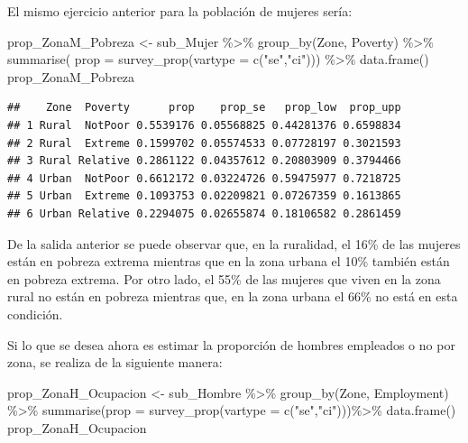 \documentclass[
  12pt,
]{book}
\newenvironment{Shaded}{\begin{snugshade}}{\end{snugshade}}
\newcommand{\AttributeTok}[1]{\textcolor[rgb]{0.77,0.63,0.00}{#1}}
\newcommand{\FunctionTok}[1]{\textcolor[rgb]{0.00,0.00,0.00}{#1}}
\newcommand{\NormalTok}[1]{#1}
\newcommand{\OtherTok}[1]{\textcolor[rgb]{0.56,0.35,0.01}{#1}}
\newcommand{\SpecialCharTok}[1]{\textcolor[rgb]{0.00,0.00,0.00}{#1}}
\newcommand{\StringTok}[1]{\textcolor[rgb]{0.31,0.60,0.02}{#1}}
\begin{document}
El mismo ejercicio anterior para la población de mujeres sería:

\begin{Shaded}
\begin{Highlighting}[]
\NormalTok{prop\_ZonaM\_Pobreza }\OtherTok{\textless{}{-}}\NormalTok{ sub\_Mujer }\SpecialCharTok{\%\textgreater{}\%} 
                      \FunctionTok{group\_by}\NormalTok{(Zone, Poverty) }\SpecialCharTok{\%\textgreater{}\%} 
                      \FunctionTok{summarise}\NormalTok{( }\AttributeTok{prop =} \FunctionTok{survey\_prop}\NormalTok{(}\AttributeTok{vartype =} \FunctionTok{c}\NormalTok{(}\StringTok{"se"}\NormalTok{,}\StringTok{"ci"}\NormalTok{))) }\SpecialCharTok{\%\textgreater{}\%}
                      \FunctionTok{data.frame}\NormalTok{()}
\NormalTok{prop\_ZonaM\_Pobreza}
\end{Highlighting}
\end{Shaded}

\begin{verbatim}
##    Zone  Poverty      prop    prop_se   prop_low  prop_upp
## 1 Rural  NotPoor 0.5539176 0.05568825 0.44281376 0.6598834
## 2 Rural  Extreme 0.1599702 0.05574533 0.07728197 0.3021593
## 3 Rural Relative 0.2861122 0.04357612 0.20803909 0.3794466
## 4 Urban  NotPoor 0.6612172 0.03224726 0.59475977 0.7218725
## 5 Urban  Extreme 0.1093753 0.02209821 0.07267359 0.1613865
## 6 Urban Relative 0.2294075 0.02655874 0.18106582 0.2861459
\end{verbatim}

De la salida anterior se puede observar que, en la ruralidad, el 16\% de las mujeres están en pobreza extrema mientras que en la zona urbana el 10\% también están en pobreza extrema. Por otro lado, el 55\% de las mujeres que viven en la zona rural no están en pobreza mientras que, en la zona urbana el 66\% no está en esta condición.

Si lo que se desea ahora es estimar la proporción de hombres empleados o no por zona, se realiza de la siguiente manera:

\begin{Shaded}
\begin{Highlighting}[]
\NormalTok{prop\_ZonaH\_Ocupacion }\OtherTok{\textless{}{-}}\NormalTok{ sub\_Hombre }\SpecialCharTok{\%\textgreater{}\%}
                        \FunctionTok{group\_by}\NormalTok{(Zone, Employment) }\SpecialCharTok{\%\textgreater{}\%} 
                        \FunctionTok{summarise}\NormalTok{(}\AttributeTok{prop =} \FunctionTok{survey\_prop}\NormalTok{(}\AttributeTok{vartype =} \FunctionTok{c}\NormalTok{(}\StringTok{"se"}\NormalTok{,}\StringTok{"ci"}\NormalTok{)))}\SpecialCharTok{\%\textgreater{}\%}
                        \FunctionTok{data.frame}\NormalTok{()}
\NormalTok{prop\_ZonaH\_Ocupacion}
\end{Highlighting}
\end{Shaded}
\end{document}
